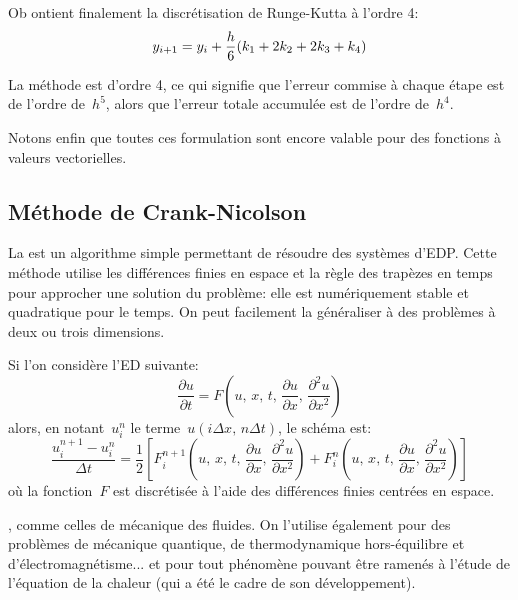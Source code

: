 \medskip
Ob ontient finalement la discrétisation de Runge-Kutta à l'ordre 4:
\begin{equation}
y_{i+1} = y_i + {h \over 6} (k_1 + 2k_2 + 2k_3 + k_4) 
\end{equation}

\medskip
La méthode est d'ordre 4, ce qui signifie que l'erreur commise à chaque étape 
est de l'ordre de~$h^5$, alors que l'erreur totale accumulée est de l'ordre de~$h^4$.

\medskip
Notons enfin que toutes ces formulation sont encore valable pour des fonctions à
valeurs vectorielles.



\medskip
\subsection{Méthode de Crank-Nicolson}

La  
est un algorithme simple permettant de résoudre des systèmes d'EDP. 
Cette méthode utilise les différences finies en espace et la règle des trapèzes en temps pour approcher une solution du problème: 
elle est numériquement stable et quadratique pour le temps. 
On peut facilement la généraliser à des problèmes à deux ou trois dimensions.

\medskip
Si l'on considère l'ED suivante:
\begin{equation}
  \frac{\partial u}{\partial t} = F\left(u,\, x,\, t,\, \frac{\partial u}{\partial x},\, \frac{\partial^2 u}{\partial x^2}\right)
\end{equation}
alors, en notant~$u_{i}^{n}$ le terme~$u(i \Delta x,\, n \Delta t)$, le schéma est:
\begin{equation}
  \frac{u_{i}^{n + 1} - u_{i}^{n}}{\Delta t} = \frac{1}{2}\left[ F_{i}^{n + 1}\left(u,\, x,\, t,\, \frac{\partial u}{\partial x},\, \frac{\partial^2 u}{\partial x^2}\right) + F_{i}^{n}\left(u,\, x,\, t,\, \frac{\partial u}{\partial x},\, \frac{\partial^2 u}{\partial x^2}\right) \right]
\end{equation}
où la fonction~$F$ est discrétisée à l'aide des différences finies centrées en espace.

\medskip
{}, comme celles de mécanique des fluides.
On l'utilise également pour des problèmes de mécanique quantique, de thermodynamique hors-équilibre
et d'électromagnétisme... et pour tout phénomène pouvant être ramenés à l'étude de l'équation de la chaleur
(qui a été le cadre de son développement).

